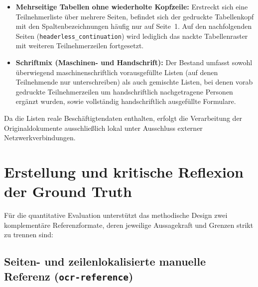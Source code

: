 \begin{itemize}
  \item \textbf{Mehrseitige Tabellen ohne wiederholte Kopfzeile:} Erstreckt sich eine Teilnehmerliste über mehrere Seiten, befindet sich der gedruckte Tabellenkopf mit den Spaltenbezeichnungen häufig nur auf Seite~1. Auf den nachfolgenden Seiten (\texttt{headerless\_continuation}) wird lediglich das nackte Tabellenraster mit weiteren Teilnehmerzeilen fortgesetzt.
  \item \textbf{Schriftmix (Maschinen- und Handschrift):} Der Bestand umfasst sowohl überwiegend maschinenschriftlich vorausgefüllte Listen (auf denen Teilnehmende nur unterschreiben) als auch gemischte Listen, bei denen vorab gedruckte Teilnehmerzeilen um handschriftlich nachgetragene Personen ergänzt wurden, sowie vollständig handschriftlich ausgefüllte Formulare.
\end{itemize}

Da die Listen reale Beschäftigtendaten enthalten, erfolgt die Verarbeitung der Originaldokumente ausschließlich lokal unter Ausschluss externer Netzwerkverbindungen.

\section{Erstellung und kritische Reflexion der Ground Truth}
\label{sec:ground-truth}

Für die quantitative Evaluation unterstützt das methodische Design zwei komplementäre Referenzformate, deren jeweilige Aussagekraft und Grenzen strikt zu trennen sind:

\subsection{Seiten- und zeilenlokalisierte manuelle Referenz (\texttt{ocr-reference})}
\label{subsec:seiten-gt}

